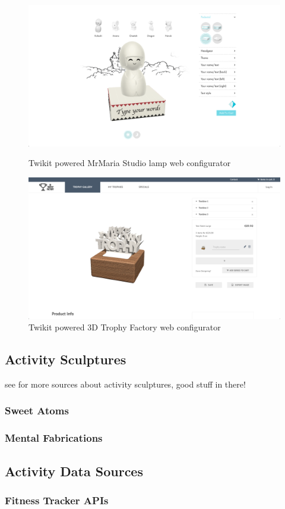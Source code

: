 \documentclass[../medieninformatik-arbeit.tex]{subfiles}
\begin{document}
\begin{figure}[h]
\captionsetup{width=0.4\textwidth}
\centering
\begin{minipage}{.45\textwidth}
\centering
  \includegraphics[width=\linewidth]{RelatedWork/img/mrmaria-config}
  \caption{\protect Twikit powered MrMaria Studio lamp web configurator\cite{unu:2015:Online}}
\label{fig:mmaria-config}
\end{minipage}
\begin{minipage}{.45\textwidth}
\centering
  \includegraphics[width=\linewidth]{RelatedWork/img/trophy-config}
  \caption{\protect Twikit powered 3D Trophy Factory web configurator\cite{timbuk2:2015:Online}}
\label{fig:trophy-config}
\end{minipage}
\end{figure}


\subsection{Activity Sculptures}
see \cite{swaminathan2014supporting} for more sources about activity sculptures, good stuff in there!

\subsubsection{Sweet Atoms}

\subsubsection{Mental Fabrications}

\subsection{Activity Data Sources}

\subsubsection{Fitness Tracker APIs}
\end{document}
